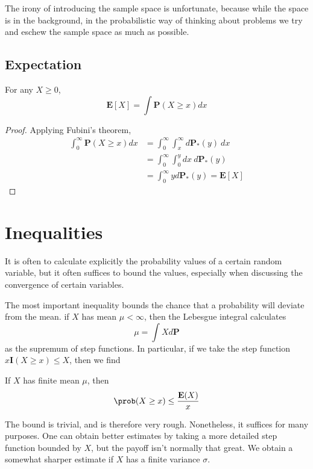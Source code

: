 The irony of introducing the sample space is unfortunate, because while the space is in the background, in the probabilistic way of thinking about problems we try and eschew the sample space as much as possible.

\section{Expectation}

\begin{theorem}
    For any $X \geq 0$,
    \[ \mathbf{E}[X] = \int \mathbf{P}(X \geq x) dx \]
\end{theorem}
\begin{proof}
    Applying Fubini's theorem,
    \begin{align*}
        \int_0^\infty \mathbf{P}(X \geq x) dx &= \int_0^\infty \int_x^\infty d \mathbf{P}_*(y)\ dx\\
        &= \int_0^\infty \int_0^y dx\ d\mathbf{P}_*(y)\\
        &= \int_0^\infty y d\mathbf{P}_*(y) = \mathbf{E}[X]
    \end{align*}
\end{proof}

\chapter{Inequalities}

It is often to calculate explicitly the probability values of a certain random variable, but it often suffices to bound the values, especially when discussing the convergence of certain variables.

The most important inequality bounds the chance that a probability will deviate from the mean. if $X$ has mean $\mu < \infty$, then the Lebesgue integral calculates
%
\[ \mu = \int X d\mathbf{P} \]
%
as the supremum of step functions. In particular, if we take the step function $x \mathbf{I}(X \geq x) \leq X$, then we find

\begin{theorem}
    If $X$ has finite mean $\mu$, then
    \[ \prob(X \geq x) \leq \frac{\mathbf{E}(X)}{x} \]
\end{theorem}

The bound is trivial, and is therefore very rough. Nonetheless, it suffices for many purposes. One can obtain better estimates by taking a more detailed step function bounded by $X$, but the payoff isn't normally that great. We obtain a somewhat sharper estimate if $X$ has a finite variance $\sigma$.

